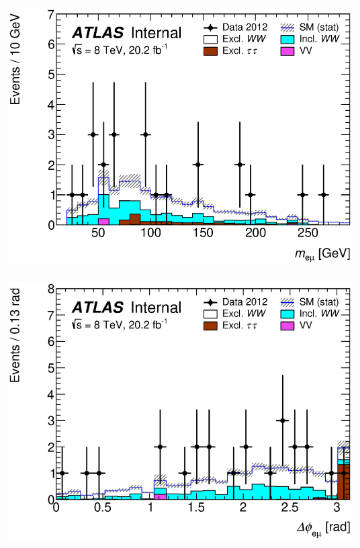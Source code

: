 \begin{figure}[!h]
\begin{subfigure}{0.5\textwidth}
   \includegraphics[width=\textwidth]{figures/emme-CutExcl1mm-Mll-lin.eps}
\end{subfigure}
\begin{subfigure}{0.5\textwidth}
   \includegraphics[width=\textwidth]{figures/emme-CutExcl1mm-DPhill-lin.eps}
\end{subfigure} 
\begin{subfigure}{0.5\textwidth}

\end{subfigure}
\end{figure}
